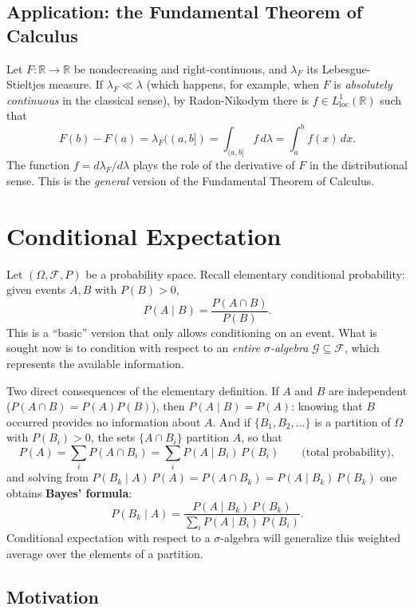 \documentclass[11pt, a4paper]{article}
\begin{document}
\subsection{Application: the Fundamental Theorem of Calculus}

Let $F: \mathbb{R} \to \mathbb{R}$ be nondecreasing and right-continuous, and $\lambda_F$ its
Lebesgue-Stieltjes measure. If $\lambda_F \ll \lambda$ (which happens, for example, when $F$ is
\emph{absolutely continuous} in the classical sense), by Radon-Nikodym there is
$f \in L^1_{\mathrm{loc}}(\mathbb{R})$ such that
$$ F(b) - F(a) = \lambda_F((a, b]) = \int_{(a, b]} f \, d\lambda = \int_a^b f(x) \, dx. $$
The function $f = d\lambda_F / d\lambda$ plays the role of the derivative of $F$ in the
distributional sense. This is the \emph{general} version of the Fundamental Theorem of Calculus.

\newpage

\section{Conditional Expectation}

Let $(\Omega, \mathcal{F}, P)$ be a probability space. Recall elementary conditional
probability: given events $A, B$ with $P(B) > 0$,
$$ P(A \mid B) = \frac{P(A \cap B)}{P(B)}. $$
This is a ``basic'' version that only allows conditioning on an event. What is sought now
is to condition with respect to an \emph{entire $\sigma$-algebra} $\mathcal{G} \subseteq \mathcal{F}$,
which represents the available information.

\obs Two direct consequences of the elementary definition. If $A$ and $B$ are independent
($P(A \cap B) = P(A) P(B)$), then $P(A \mid B) = P(A)$: knowing that $B$ occurred provides no
information about $A$. And if $\{B_1, B_2, \dots\}$ is a partition of $\Omega$ with
$P(B_i) > 0$, the sets $\{A \cap B_i\}$ partition $A$, so that
$$ P(A) = \sum_i P(A \cap B_i) = \sum_i P(A \mid B_i) \, P(B_i)
\qquad \text{(total probability)}, $$
and solving from $P(B_k \mid A) \, P(A) = P(A \cap B_k) = P(A \mid B_k) \, P(B_k)$ one obtains
\textbf{Bayes' formula}:
$$ P(B_k \mid A) = \frac{P(A \mid B_k) \, P(B_k)}{\sum_i P(A \mid B_i) \, P(B_i)}. $$
Conditional expectation with respect to a $\sigma$-algebra will generalize this weighted average
over the elements of a partition.

\subsection{Motivation}
\end{document}
